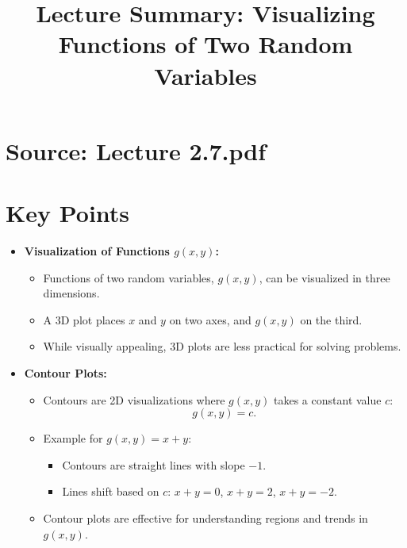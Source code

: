 \documentclass{article}
\title{Lecture Summary: Visualizing Functions of Two Random Variables}
\author{}
\date{}
\begin{document}
\maketitle

\section*{Source: Lecture 2.7.pdf}

\section*{Key Points}

\begin{itemize}
  \item \textbf{Visualization of Functions $g(x, y)$:}
    \begin{itemize}
      \item Functions of two random variables, $g(x, y)$, can be visualized in three dimensions.
      \item A 3D plot places $x$ and $y$ on two axes, and $g(x, y)$ on the third.
      \item While visually appealing, 3D plots are less practical for solving problems.
    \end{itemize}

  \item \textbf{Contour Plots:}
    \begin{itemize}
      \item Contours are 2D visualizations where $g(x, y)$ takes a constant value $c$:
        \[
          g(x, y) = c.
        \]
      \item Example for $g(x, y) = x + y$:
        \begin{itemize}
          \item Contours are straight lines with slope $-1$.
          \item Lines shift based on $c$: $x + y = 0$, $x + y = 2$, $x + y = -2$.
        \end{itemize}
      \item Contour plots are effective for understanding regions and trends in $g(x, y)$.
    \end{itemize}


\end{itemize}
\end{document}
